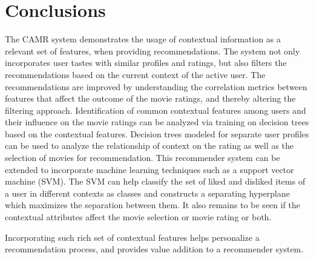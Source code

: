 \documentclass{article}
\begin{document}
%  
%
%
%


\section{Conclusions}
The CAMR system demonstrates the usage of contextual information as a relevant set of features, when providing recommendations. The system not only incorporates user tastes with similar profiles and ratings, but also filters the recommendations based on the current context of the active user. The recommendations are improved by understanding the correlation metrics between features that affect the outcome of the movie ratings, and thereby altering the filtering approach. Identification of common contextual features among users and their influence on the movie ratings can be analyzed via training on decision trees based on the contextual features. Decision trees modeled for separate user profiles can be used to analyze the relationship of context on the rating as well as the selection of movies for recommendation. This recommender system can be extended to incorporate machine learning techniques such as a support vector machine (SVM). The SVM can help classify the set of liked and disliked items of a user in different contexts as classes and constructs a separating hyperplane which maximizes the separation between them. It also remains to be seen if the contextual attributes affect the movie selection or movie rating or both.


Incorporating such rich set of contextual features helps personalize a recommendation process, and provides value addition to a recommender system.
\end{document}
